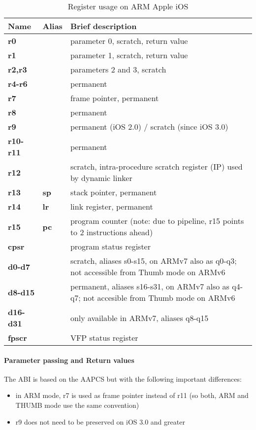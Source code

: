 \begin{table}[h]
\begin{tabular*}{0.95\textwidth}{lll}
Name         & Alias    & Brief description\\
\hline
{\bf r0}     &          & parameter 0, scratch, return value\\
{\bf r1}     &          & parameter 1, scratch, return value\\
{\bf r2,r3}  &          & parameters 2 and 3, scratch\\
{\bf r4-r6}  &          & permanent\\
{\bf r7}     &          & frame pointer, permanent\\
{\bf r8}     &          & permanent\\
{\bf r9}     &          & permanent (iOS 2.0) / scratch (since iOS 3.0)\\
{\bf r10-r11}&          & permanent\\
{\bf r12}    &          & scratch, intra-procedure scratch register (IP) used by dynamic linker\\
{\bf r13}    & {\bf sp} & stack pointer, permanent\\
{\bf r14}    & {\bf lr} & link register, permanent\\
{\bf r15}    & {\bf pc} & program counter (note: due to pipeline, r15 points to 2 instructions ahead)\\
{\bf cpsr}   &          & program status register\\
{\bf d0-d7}  &          & scratch, aliases s0-s15, on ARMv7 also as q0-q3; not accessible from Thumb mode on ARMv6\\
{\bf d8-d15} &          & permanent, aliases s16-s31, on ARMv7 also as q4-q7; not accesible from Thumb mode on ARMv6\\
{\bf d16-d31}&          & only available in ARMv7, aliases q8-q15\\
{\bf fpscr}  &          & VFP status register\\
\end{tabular*}
\caption{Register usage on ARM Apple iOS}
\end{table}

\paragraph{Parameter passing and Return values}

The ABI is based on the AAPCS but with the following important differences:

\begin{itemize}
\item in ARM mode, r7 is used as frame pointer instead of r11 (so both, ARM and THUMB mode use the same convention)
\item r9 does not need to be preserved on iOS 3.0 and greater
\end{itemize}


